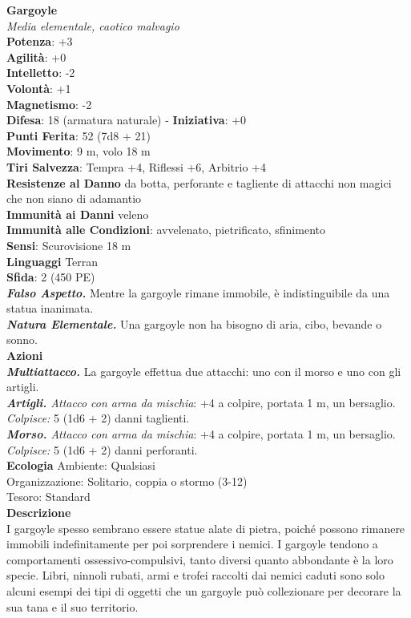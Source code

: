 \begin{multicols}{2}
\medskip\textbf{Gargoyle}\\
\emph{Media elementale, caotico malvagio}\\
\textbf{Potenza}: +3\\
\textbf{Agilità}: +0\\
\textbf{Intelletto}: -2\\
\textbf{Volontà}: +1\\
\textbf{Magnetismo}: -2\\
\textbf{Difesa}: 18 (armatura naturale) - \textbf{Iniziativa}: +0\\
\textbf{Punti Ferita}: 52 (7d8 + 21)\\
\textbf{Movimento}: 9 m, volo 18 m\\
\textbf{Tiri Salvezza}: Tempra +4, Riflessi +6, Arbitrio +4\\
\textbf{Resistenze al Danno} da botta, perforante e tagliente di attacchi non magici che non siano di adamantio\\
\textbf{Immunità ai Danni} veleno\\
\textbf{Immunità alle Condizioni}: avvelenato, pietrificato, sfinimento\\
\textbf{Sensi}: Scurovisione 18 m\\
\textbf{Linguaggi} Terran\\
\textbf{Sfida}: 2 (450 PE)\smallskip\\
\emph{\textbf{Falso Aspetto.}} Mentre la gargoyle rimane immobile, è indistinguibile da una statua inanimata.\\
\emph{\textbf{Natura Elementale.}} Una gargoyle non ha bisogno di aria, cibo, bevande o sonno.\\
\smallskip\textbf{Azioni}\\
\emph{\textbf{Multiattacco.}} La gargoyle effettua due attacchi: uno con il morso e uno con gli artigli.\\
\emph{\textbf{Artigli.} Attacco con arma da mischia}: +4 a colpire, portata 1 m, un bersaglio.\\
\emph{Colpisce:} 5 (1d6 + 2) danni taglienti.\\
\emph{\textbf{Morso.} Attacco con arma da mischia}: +4 a colpire, portata 1 m, un bersaglio.\\
\emph{Colpisce:} 5 (1d6 + 2) danni perforanti.\\
\textbf{Ecologia}
Ambiente: Qualsiasi\\
Organizzazione: Solitario, coppia o stormo (3-12)\\
Tesoro: Standard\\
\textbf{Descrizione}\\
I gargoyle spesso sembrano essere statue alate di pietra, poiché possono rimanere immobili indefinitamente per poi sorprendere i nemici. I gargoyle tendono a comportamenti ossessivo-compulsivi, tanto diversi quanto abbondante è la loro specie. Libri, ninnoli rubati, armi e trofei raccolti dai nemici caduti sono solo alcuni esempi dei tipi di oggetti che un gargoyle può collezionare per decorare la sua tana e il suo territorio.\\


\end{multicols}
